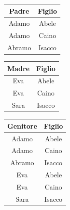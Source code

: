 \documentclass{article}
\begin{document}
\begin{minipage}{.2\textwidth}
  \centering
           \begin{tabular}{|c|c|}
                 \hline
                 \textbf{Padre} & \textbf{Figlio}  \\
                 \hline
                 Adamo & Abele \\
                 \hline
                 Adamo & Caino \\
                 \hline
                 Abramo & Isacco \\
                 \hline
            \end{tabular}
\hspace{1em}
\end{minipage}
\hfill
\begin{minipage}{.2\textwidth}
  \centering
           \begin{tabular}{|c|c|}
                 \hline
                 \textbf{Madre} & \textbf{Figlio} \\
                 \hline
                    Eva & Abele \\
                    \hline
                    Eva & Caino \\
                    \hline
                    Sara & Isacco\\
                 \hline
            \end{tabular}
\hspace{1em}
\end{minipage}
\hfill
\begin{minipage}{.4\textwidth}
  \centering
           \begin{tabular}{|c|c|}
                 \hline
                 \textbf{Genitore} & \textbf{Figlio} \\
                 \hline
                 Adamo & Abele \\
                 \hline
                 Adamo & Caino \\
                 \hline
                 Abramo & Isacco \\
                 \hline
                    Eva & Abele \\
                    \hline
                    Eva & Caino \\
                    \hline
                    Sara & Isacco\\
                 \hline
            \end{tabular}
\hspace{1em}
\end{minipage}
\end{document}

